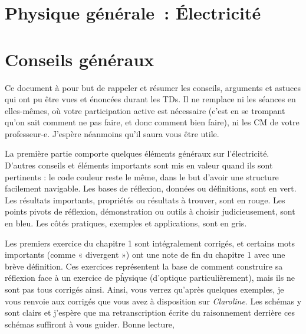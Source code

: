 \documentclass[../main/main.tex]{subfiles}
\begin{document}
\chapter*{Physique générale~: \'Electricité}


\dominitoc
\toccontents

\setcounter{chapter}{-1}
\chapter{Conseils généraux}
Ce document à pour but de rappeler et résumer les conseils, arguments et astuces
qui ont pu être vues et énoncées durant les TDs. Il ne remplace ni les séances
en elles-mêmes, où votre participation active est nécessaire (c'est en se
trompant qu'on sait comment ne pas faire, et donc comment bien faire), ni les CM
de votre professeur-e. J'espère néanmoins qu'il saura vous être utile.
\smallbreak

La première partie comporte quelques éléments généraux sur l'électricité.
D'autres conseils et éléments importants sont mis en valeur quand ils sont
pertinents : le code couleur reste le même, dans le but d'avoir une structure
facilement navigable. Les bases de réflexion, données ou définitions, sont en
vert. Les résultats importants, propriétés ou résultats à trouver, sont en
rouge. Les points pivots de réflexion, démonstration ou outils à choisir
judicieusement, sont en bleu. Les côtés pratiques, exemples et applications,
sont en gris. \smallbreak

Les premiers exercice du chapitre 1 sont intégralement corrigés, et certains
mots importants (comme « divergent ») ont une note de fin du chapitre 1 avec une
brève définition. Ces exercices représentent la base de comment construire sa
réflexion face à un exercice de pĥysique (d'optique particulièrement), mais ils
ne sont pas tous corrigés ainsi. Ainsi, vous verrez qu'après quelques exemples,
je vous renvoie aux corrigés que vous avez à disposition sur \textit{Claroline}.
Les schémas y sont clairs et j'espère que ma retranscription écrite du
raisonnement derrière ces schémas suffiront à vous guider. \hfill Bonne lecture,
\smallbreak
\end{document}
